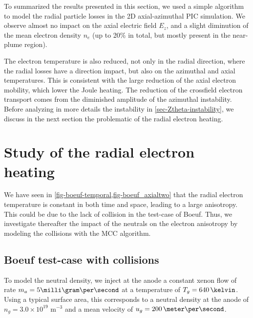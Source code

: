   \vspace{1em}
  To summarized the results presented in this section, we used a simple algorithm to model the radial particle losses in the \ac{2D} axial-azimuthal \ac{PIC} simulation.
  We observe almost no impact on the axial electric field $E_z$, and a slight diminution of the mean electron density $n_e$ (up to 20\% in total, but mostly present in the near-plume region).
  
  The electron temperature is also reduced, not only in the radial direction, where the radial losses have a direction impact, but also on the azimuthal and axial temperatures.
  This is consistent with the large reduction of the axial electron mobility, which lower the Joule heating.
  The reduction of the crossfield electron transport comes from the diminished amplitude of the azimuthal instability.
  Before analyzing in more details the instability in \cref{sec-Ztheta-instability}, we discuss in the next section the problematic of the radial electron heating.


  \FloatBarrier
  \section{Study of the radial electron heating}
    We have seen in \cref{fig-boeuf-temporal,fig-boeuf_axialtwo} that the radial electron temperature is constant in both time and space, leading to a large anisotropy.
    This could be due to the lack of collision in the test-case of Boeuf.
    Thus, we investigate thereafter the impact of the neutrals on the electron anisotropy by modeling the collisions with the \ac{MCC} algorithm.
    
  \subsection{Boeuf test-case with collisions} \label{subsec-MCC_boeuf}

  To model the neutral density, we inject at the anode a constant xenon flow of rate $m_a = 5 \milli\gram\per\second$ at a temperature of $T_g = 640\,\kelvin$.
  Using a typical surface area, this corresponds to a neutral density at the anode of $n_g=3.0 \times 10^{19}$ {m}$^{-3}$ and a mean velocity of $u_g = 200 \,\meter\per\second$.
  
